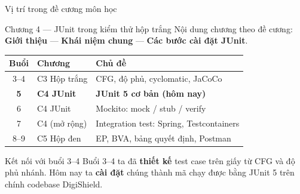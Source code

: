 \documentclass[aspectratio=169,12pt]{beamer}
\begin{document}
\begin{frame}[shrink=8]{Vị trí trong đề cương môn học}
  \begin{block}{Chương 4 --- JUnit trong kiểm thử hộp trắng}
    Nội dung chương theo đề cương: \textbf{Giới thiệu} ---
    \textbf{Khái niệm chung} --- \textbf{Các bước cài đặt JUnit}.
  \end{block}

  \vspace{0.35em}
  \begin{center}
  \small
  \begin{tabular}{cll}
    \toprule
    \textbf{Buổi} & \textbf{Chương} & \textbf{Chủ đề} \\
    \midrule
    3--4 & C3 Hộp trắng & CFG, độ phủ, cyclomatic, JaCoCo \\
    \rowcolor{lightgray}
    \textbf{5} & \textbf{C4 JUnit} & \textbf{JUnit 5 cơ bản (hôm nay)} \\
    6 & C4 JUnit & Mockito: mock / stub / verify \\
    7 & C4 (mở rộng) & Integration test: Spring, Testcontainers \\
    8--9 & C5 Hộp đen & EP, BVA, bảng quyết định, Postman \\
    \bottomrule
  \end{tabular}
  \end{center}

  \vspace{0.35em}
  \begin{exampleblock}{Kết nối với buổi 3--4}
    Buổi 3--4 ta đã \textbf{thiết kế} test case trên giấy từ CFG và độ phủ nhánh.
    Hôm nay ta \textbf{cài đặt} chúng thành mã chạy được bằng JUnit 5
    trên chính codebase DigiShield.
  \end{exampleblock}
\end{frame}
\end{document}
